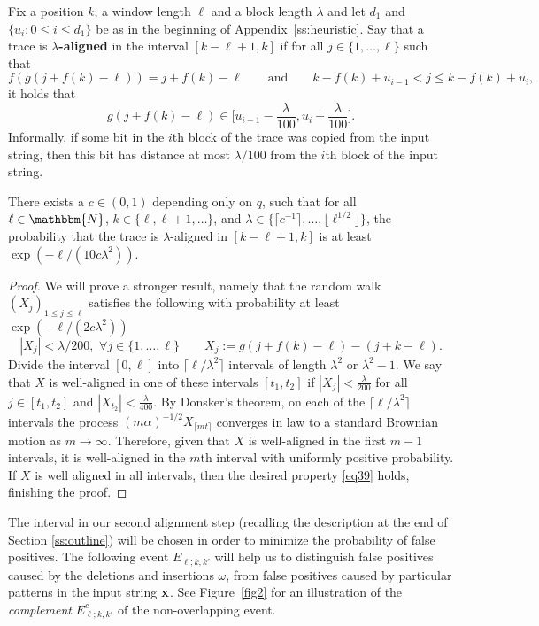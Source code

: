 \documentclass[final,12pt]{colt2018} %
\newcommand{\N}{\mathbbm{N}}
\newcommand{\1}{\mathbf{1}}
\newcommand{\eqb}{\begin{equation}}
\newcommand{\eqe}{\end{equation}}
\newcommand{\eqbn}{\begin{equation*}}
\newcommand{\eqen}{\end{equation*}}
\newcommand{\rta}{\rightarrow}
\def\x{{\bf x}}
\begin{document}
\begin{definition}
	Fix a position $k$, a window length $\ell$ and a block length $\lambda$
	and let $d_1$ and $\{ u_i : 0 \leq i \leq d_1 \}$ be as in the beginning
	of Appendix~\ref{ss:heuristic}.  Say that a trace is {\bf $\lambda$-aligned}
	in the interval $[k - \ell + 1 , k]$ if for all $j\in\{1,\dots,\ell \}$ such that
	\eqbn
	f(g(j+f(k)-\ell))=j+f(k)-\ell\qquad\text{and}\qquad k-f(k)+ u_{i-1}< j\leq k-f(k)+u_i,
	\eqen
	it holds that
	\eqbn
	g(j+f(k)-\ell)\in\Big[u_{i-1}-\frac{\lambda}{100},u_i+\frac{\lambda}{100}\Big].
	\eqen
	Informally, if some bit in the $i$th block of the trace was copied from the input string, then this bit has distance at most $\lambda/100$ from the $i$th block of the input string.
\end{definition}

\begin{lemma}\label{prop18}
	There exists a $c \in (0,1)$ depending only on $q$, such that
	for all $\ell \in \N$, $k \in \{\ell , \ell + 1 , \dots \}$,
	and $\lambda \in \{ \lceil c^{-1} \rceil , \dots , \lfloor
	\ell^{1/2} \rfloor \}$, the probability that the trace is
	$\lambda$-aligned in $[k-\ell+1,k]$ is at least
	$\exp(- \ell / (10 c \lambda^2))$.
\end{lemma}

\begin{proof}
	We will prove a stronger result, namely that the random walk $(X_j)_{1\leq j \leq \ell}$ satisfies the following with probability at least $\exp(- \ell / (2 c \lambda^2))$
	\eqb
	|X_j|<\lambda/200,\,\,\forall j\in\{1,\dots,\ell \} \qquad
	X_j:= g(j+f(k)-\ell)-(j+k-\ell).
	\label{eq39}
	\eqe
	Divide the interval $[0,\ell]$ into $\lceil \ell / \lambda^2 \rceil$ intervals of length $\lambda^2$ or $\lambda^2 - 1$. We say that $X$ is well-aligned in one of these intervals $[t_1,t_2]$ if $|X_j| < \frac{\lambda}{200}$
	for all $j \in [t_1 , t_2]$ and $|X_{t_2}| < \frac{\lambda}{400}$. By Donsker's theorem, on each of the $\lceil \ell / \lambda^2 \rceil$
	intervals the process $(m\alpha)^{-1/2} X_{ \lceil mt \rceil }$
	converges in law to a standard Brownian motion as $m \rta \infty$.
	Therefore, given that $X$ is well-aligned in the first $m-1$ intervals,
	it is well-aligned in the $m$th interval with uniformly positive
	probability. If $X$ is well aligned in all intervals, then the desired property \eqref{eq39} holds, finishing the proof.
\end{proof}

The interval in our second alignment step (recalling the description
at the end of Section \ref{ss:outline}) will be chosen in order to
minimize the probability of false positives.
The following event $E_{\ell;k,k'}$ will help us to distinguish
false positives caused by the deletions and insertions $\omega$,
from false positives caused by particular patterns in the input
string $\x$.  See Figure~\ref{fig2} for an illustration of the
\emph{complement} $E^c_{\ell ; k , k'}$ of the non-overlapping event.
\end{document}
